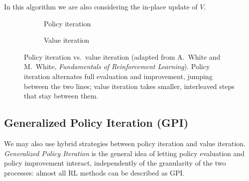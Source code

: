 In this algorithm we are also considering the in-place update of $V$.
\begin{figure}[H]
\centering
\begin{subfigure}[t]{0.48\textwidth}
  \centering
  \caption{Policy iteration}
\end{subfigure}
\hfill
\begin{subfigure}[t]{0.48\textwidth}
  \centering
  \caption{Value iteration}
\end{subfigure}
\caption{Policy iteration vs.\ value iteration (adapted from A.~White and
M.~White, \emph{Fundamentals of Reinforcement Learning}).
Policy iteration alternates full evaluation and improvement, jumping between
the two lines; value iteration takes smaller, interleaved steps that stay
between them.}
\label{fig:pi-vs-vi}
\end{figure}

\subsection{Generalized Policy Iteration (GPI)}
We may also use hybrid strategies between policy iteration and value iteration. \textit{Generalized Policy Iteration} is the general idea of letting policy evaluation and policy improvement interact, independently of the granularity of the two processes: almost all RL methods can be described as GPI.

